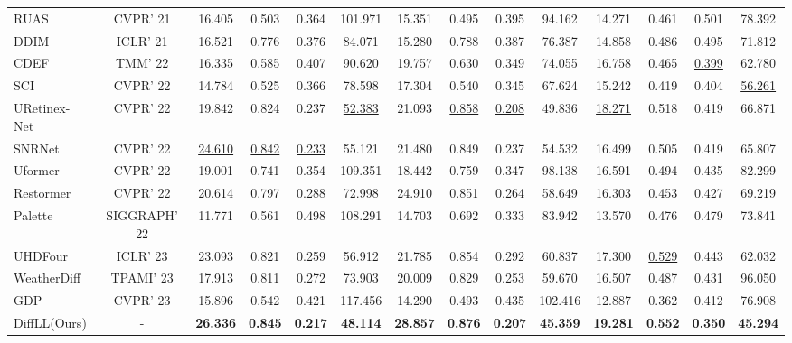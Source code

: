 \begin{table*}[!t]
{\begin{tabular}{l|c|cccc|cccc|cccc}
			RUAS & CVPR' 21 & 16.405 & 0.503 & 0.364 & 101.971 & 15.351 & 0.495 & 0.395 & 94.162 & 14.271 & 0.461 & 0.501 & 78.392 \\
			DDIM & ICLR' 21 & 16.521 & 0.776 & 0.376 & 84.071 & 15.280 & 0.788 & 0.387 & 76.387 & 14.858 & 0.486 & 0.495 & 71.812 \\
			CDEF & TMM' 22 & 16.335 & 0.585 & 0.407 & 90.620 & 19.757 & 0.630 & 0.349 & 74.055 & 16.758 & 0.465 & \underline{0.399} & 62.780 \\
			SCI & CVPR' 22 & 14.784 & 0.525 & 0.366 & 78.598 & 17.304 & 0.540 & 0.345 & 67.624 & 15.242 & 0.419 & 0.404 & \underline{56.261} \\
			URetinex-Net & CVPR' 22 & 19.842 & 0.824 & 0.237 & \underline{52.383} & 21.093 & \underline{0.858} & \underline{0.208} & 49.836 & \underline{18.271} & 0.518 & 0.419 & 66.871 \\
			SNRNet & CVPR' 22 & \underline{24.610} & \underline{0.842} & \underline{0.233} & 55.121 & 21.480 & 0.849 & 0.237 & 54.532 & 16.499 & 0.505 & 0.419 & 65.807 \\
			Uformer & CVPR' 22 & 19.001 & 0.741 & 0.354 & 109.351 & 18.442 & 0.759 & 0.347 & 98.138 & 16.591 & 0.494 & 0.435 & 82.299 \\
			Restormer & CVPR' 22 & 20.614 & 0.797 & 0.288 & 72.998 & \underline{24.910} & 0.851 & 0.264 & 58.649 & 16.303 & 0.453 & 0.427 & 69.219 \\
			Palette & SIGGRAPH' 22 & 11.771 & 0.561 & 0.498 & 108.291 & 14.703 & 0.692 & 0.333 & 83.942 & 13.570 & 0.476 & 0.479 & 73.841 \\
			UHDFour & ICLR' 23 & 23.093 & 0.821 & 0.259 & 56.912 & 21.785 & 0.854 & 0.292 & 60.837 & 17.300 & \underline{0.529} & 0.443 & 62.032 \\
WeatherDiff & TPAMI' 23 & 17.913 & 0.811 & 0.272 & 73.903 & 20.009 & 0.829 & 0.253 & 59.670 & 16.507 & 0.487 & 0.431 & 96.050 \\
			GDP & CVPR' 23 & 15.896 & 0.542 & 0.421 & 117.456 & 14.290 & 0.493 & 0.435 & 102.416 & 12.887 & 0.362 & 0.412 & 76.908 \\
			DiffLL(Ours) & - & \textbf{26.336} & \textbf{0.845} & \textbf{0.217} & \textbf{48.114} & \textbf{28.857} & \textbf{0.876} & \textbf{0.207} & \textbf{45.359} & \textbf{19.281} & \textbf{0.552} & \textbf{0.350} & \textbf{45.294} \\
			\bottomrule
	\end{tabular}}
	\label{tab:evaluation_paired}
\end{table*}

